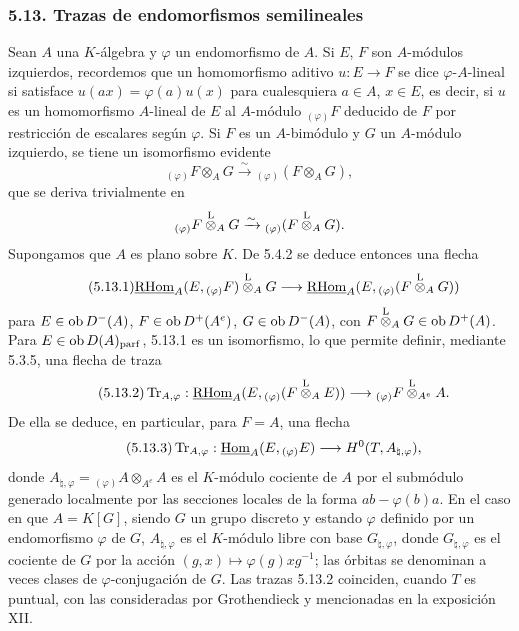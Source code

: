\subsubsection*{5.13. Trazas de endomorfismos semilineales}

Sean $A$ una $K$-álgebra y $\varphi$ un endomorfismo de $A$. Si $E$, $F$ son $A$-módulos izquierdos, recordemos que un homomorfismo aditivo $u:E\to F$ se dice $\varphi$-$A$-lineal si satisface $u(ax)=\varphi(a)u(x)$ para cualesquiera $a\in A$, $x\in E$, es decir, si $u$ es un homomorfismo $A$-lineal de $E$ al $A$-módulo ${}_{(\varphi)}F$ deducido de $F$ por restricción de escalares según $\varphi$. Si $F$ es un $A$-bimódulo y $G$ un $A$-módulo izquierdo, se tiene un isomorfismo evidente
\[
{}_{(\varphi)}F\otimes_AG\xrightarrow{\sim}{}_{(\varphi)}(F\otimes_AG),
\]
que se deriva trivialmente en
\[
{}_{(\varphi)}F\overset{\mathrm L}{\otimes}_AG\xrightarrow{\sim}{}_{(\varphi)}(F\overset{\mathrm L}{\otimes}_AG).
\]
Supongamos que $A$ es plano sobre $K$. De 5.4.2 se deduce entonces una flecha
\begin{equation}\tag{5.13.1}
\underline{\mathrm{RHom}}_A(E,{}_{(\varphi)}F)\overset{\mathrm L}{\otimes}_AG\longrightarrow\underline{\mathrm{RHom}}_A(E,{}_{(\varphi)}(F\overset{\mathrm L}{\otimes}_AG))
\end{equation}
para $E\in\operatorname{ob} D^-(A)$, $F\in\operatorname{ob} D^+(A^e)$, $G\in\operatorname{ob} D^-(A)$, con $F\overset{\mathrm L}{\otimes}_AG\in\operatorname{ob} D^+(A)$. Para $E\in\operatorname{ob} D(A)_{\mathrm{parf}}$, 5.13.1 es un isomorfismo, lo que permite definir, mediante 5.3.5, una flecha de traza
\begin{equation}\tag{5.13.2}
\operatorname{Tr}_{A,\varphi}:\underline{\mathrm{RHom}}_A(E,{}_{(\varphi)}(F\overset{\mathrm L}{\otimes}_AE))\longrightarrow {}_{(\varphi)}F\overset{\mathrm L}{\otimes}_{A^e}A.
\end{equation}
De ella se deduce, en particular, para $F=A$, una flecha
\begin{equation}\tag{5.13.3}
\operatorname{Tr}_{A,\varphi}:\underline{\operatorname{Hom}}_A(E,{}_{(\varphi)}E)\longrightarrow H^0(T,A_{\natural,\varphi}),
\end{equation}
donde $A_{\natural,\varphi}={}_{(\varphi)}A\otimes_{A^e}A$ es el $K$-módulo cociente de $A$ por el submódulo generado localmente por las secciones locales de la forma $ab-\varphi(b)a$. En el caso en que $A=K[G]$, siendo $G$ un grupo discreto y estando $\varphi$ definido por un endomorfismo $\varphi$ de $G$, $A_{\natural,\varphi}$ es el $K$-módulo libre con base $G_{\natural,\varphi}$, donde $G_{\natural,\varphi}$ es el cociente de $G$ por la acción $(g,x)\mapsto\varphi(g)xg^{-1}$; las órbitas se denominan a veces clases de $\varphi$-conjugación de $G$. Las trazas 5.13.2 coinciden, cuando $T$ es puntual, con las consideradas por Grothendieck y mencionadas en la exposición XII.

